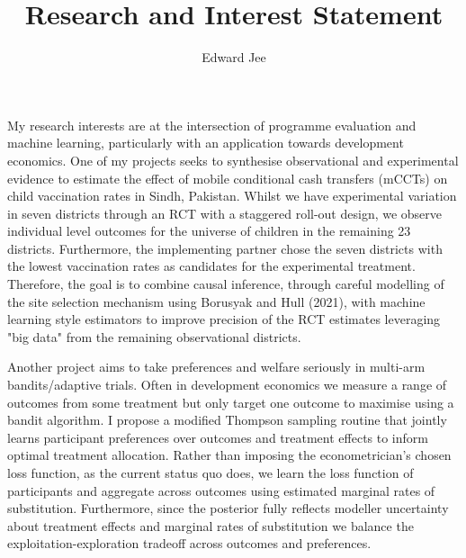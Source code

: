 \documentclass{article}
\author{Edward Jee}
\title{Research and Interest Statement}
\begin{document}
\maketitle

My research interests are at the intersection of programme evaluation and machine 
learning, particularly with an application towards development economics. One 
of my projects seeks to synthesise observational and experimental evidence to 
estimate the effect of mobile conditional cash transfers (mCCTs) on 
child vaccination rates in Sindh, Pakistan. Whilst we have experimental variation 
in seven districts through an RCT with a staggered roll-out design, we observe 
individual level outcomes for 
the universe of children in the remaining 23 districts. Furthermore, the implementing 
partner chose the seven districts with the lowest vaccination rates as candidates 
for the experimental treatment. Therefore, the goal is to combine causal inference, 
through careful modelling of the site selection mechanism using Borusyak and Hull (2021), 
with machine learning style estimators to improve precision of the RCT estimates 
leveraging "big data" from the remaining observational districts.



Another project aims to take preferences and welfare seriously in multi-arm 
bandits/adaptive trials. Often in development economics we measure a range of 
outcomes from some treatment but only target one outcome to maximise using a 
bandit algorithm. I propose a modified Thompson sampling routine that jointly 
learns participant preferences over outcomes and treatment effects to inform optimal treatment 
allocation. Rather than imposing the econometrician's chosen loss function, as 
the current status quo does, we learn the loss function of participants and 
aggregate across outcomes using estimated marginal rates of substitution. Furthermore, 
since the posterior fully reflects modeller uncertainty about treatment effects 
and marginal rates of substitution we balance the exploitation-exploration 
tradeoff across outcomes and preferences.



    
\end{document}
